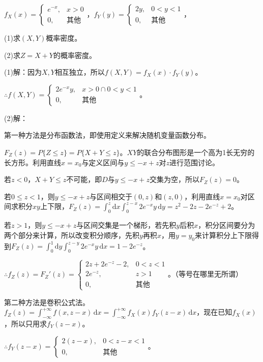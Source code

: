 \documentclass[UTF8, 12pt]{ctexart}
\begin{document}
$f_X(x)=\left\{\begin{array}{ll}
    e^{-x}, & x>0 \\
    0, & \text{其他} 
\end{array}\right.$，$f_Y(y)=\left\{\begin{array}{ll}
    2y, & 0<y<1 \\
    0, & \text{其他} 
\end{array}\right.$，

(1)求$(X,Y)$概率密度。

(2)求$Z=X+Y$的概率密度。

(1)解：因为$X,Y$相互独立，所以$f(X,Y)=f_X(x)\cdot f_Y(y)$。

$\therefore f(X,Y)=\left\{\begin{array}{ll}
    2e^{-x}y, & x>0\cap0<y<1 \\
    0, & \text{其他} 
\end{array}\right.$。

(2)解：

第一种方法是分布函数法，即使用定义来解决随机变量函数分布。

$F_Z(z)=P\{Z\leqslant z\}=P\{X+Y\leqslant z\}$。$XY$的联合分布图形是一个高为1长无穷的长方形。利用直线$x=x_0$与定义区间与$y\leqslant -x+z$对$z$进行范围讨论。

若$z<0$，$X+Y\leqslant z$不可能，即$D$与$y\leqslant-x+z$交集为空，所以$F_Z(z)=0$。

若$0\leqslant z<1$，则$y\leqslant -x+z$与区间相交于$(0,z)$和$(z,0)$，利用直线$x=x_0$对区间求积分$xy$上下限，$F_Z(z)=\int_0^z\textrm{d}x\int_0^{z-x}2e^{-x}y\,\textrm{d}y=z^2-2z-2e^{-z}+2$。

若$z>1$，则$y\leqslant -x+z$与区间交集是一个梯形，若先积$y$后积$x$，积分区间要分为两个部分来计算，所以改变积分顺序，先积$y$再积$x$，用$y=y_0$来计算积分上下限得到$F_Z(z)=\int_0^1\textrm{d}y\int_0^{z-y}2e^{-x}y\,\textrm{d}x=1-2e^{-z}$。

$\therefore f_Z(z)=F_Z'(z)=\left\{\begin{array}{ll}
    2z+2e^{-z}-2, & 0<z<1 \\
    2e^{-z}, & z>1 \\
    0, & \textbf{其他}
\end{array}\right.$。（等号在哪里无所谓）

第二种方法是卷积公式法。$f_Z(z)=\int_{-\infty}^{+\infty}f(x,z-x)\,\textrm{d}x=\int_{-\infty}^{+\infty}f_X(x)f_Y(z-x)\,\textrm{d}x$，现在已知$f_X(x)$，所以只用求$f_Y(z-x)$。

$\therefore f_Y(z-x)=\left\{\begin{array}{ll}
    2(z-x), & 0<z-x<1 \\
    0, & \textbf{其他}
\end{array}\right.$。
\end{document}
